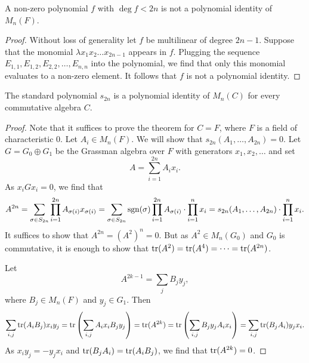 \begin{lema}
A non-zero polynomial $f$ with $\deg f < 2n$ is not a polynomial
identity of $M_n(F)$.
\end{lema}

\begin{proof}
Without loss of generality let $f$ be multilinear of degree $2n-1$.
Suppose that the monomial $\lambda x_1 x_2 \dots x_{2n-1}$ appears
in $f$. Plugging the sequence
$E_{1,1}, E_{1,2}, E_{2,2}, \dots, E_{n,n}$ into the polynomial, we
find that only this monomial evaluates to a non-zero element. It
follows that $f$ is not a polynomial identity.
\end{proof}

\begin{izrek}
The standard polynomial $s_{2n}$ is a polynomial identity of
$M_n(C)$ for every commutative algebra $C$.
\end{izrek}

\begin{proof}
Note that it suffices to prove the theorem for $C = F$, where $F$
is a field of characteristic $0$. Let $A_i \in M_n(F)$. We will
show that $s_{2n}(A_1, \dots, A_{2n}) = 0$. Let
$G = G_0 \oplus G_1$ be the Grassman algebra over $F$ with
generators $x_1, x_2, \dots$ and set
\[
A = \sum_{i=1}^{2n} A_i x_i.
\]
As $x_i G x_i = 0$, we find that
\[
A^{2n} =
\sum_{\sigma \in S_{2n}}
\prod_{i=1}^{2n} A_{\sigma(i)} x_{\sigma(i)} =
\sum_{\sigma \in S_{2n}} \operatorname{sgn}(\sigma)
\prod_{i=1}^{2n} A_{\sigma(i)} \cdot \prod_{i=1}^n x_i =
s_{2n}(A_1, \dots, A_{2n}) \cdot \prod_{i=1}^n x_i.
\]
It suffices to show that $A^{2n} = (A^2)^n = 0$. But as
$A^2 \in M_n(G_0)$ and $G_0$ is commutative, it is enough to show
that $\operatorname{tr}(A^2) = \operatorname{tr}(A^4) = \dots = \operatorname{tr}(A^{2n})$.

Let
\[
A^{2k-1} = \sum_{j} B_j y_j,
\]
where $B_j \in M_n(F)$ and $y_j \in G_1$. Then
\[
\sum_{i,j} \operatorname{tr}(A_i B_j) x_i y_j =
\operatorname{tr} \left(\sum_{i,j} A_i x_i B_j y_j\right) =
\operatorname{tr}(A^{2k}) =
\operatorname{tr} \left(\sum_{i,j} B_j y_j A_i x_i\right) =
\sum_{i,j} \operatorname{tr}(B_j A_i) y_j x_i.
\]
As $x_i y_j = - y_j x_i$ and $\operatorname{tr}(B_j A_i) = \operatorname{tr}(A_i B_j)$, we find
that $\operatorname{tr}(A^{2k}) = 0$.
\end{proof}
